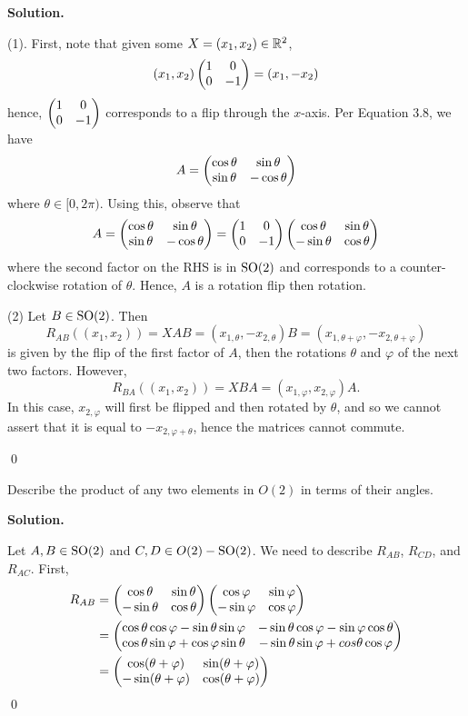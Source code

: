 \documentclass[12pt]{book}
\theoremstyle{definition}
\newenvironment{solution}
{%
  \par\noindent\textbf{Solution.}\quad
}
{%
  \qed\par
}
\begin{document}
\begin{solution}
  (1). First, note that given some $X = (x_1, x_2) \in \mathbb{R}^2$,
  \[
    (x_1, x_2)\begin{pmatrix} 1 & 0 \\ 0 & -1 \end{pmatrix} = (x_1, -x_2)
  \]
  hence, $\begin{pmatrix} 1 & 0 \\ 0 & -1 \end{pmatrix}$ corresponds to a flip through the $x$-axis.
  Per Equation 3.8, we have
  \[
  A = \begin{pmatrix} \cos\theta & \sin\theta \\ \sin\theta & -\cos\theta \end{pmatrix}
  \]
  where $\theta \in [0, 2\pi)$.
  Using this, observe that
  \[
    A = \begin{pmatrix} \cos\theta & \sin\theta \\ \sin\theta & -\cos\theta \end{pmatrix} = \begin{pmatrix} 1 & 0 \\ 0 & -1 \end{pmatrix} \begin{pmatrix} \cos \theta & \sin \theta \\ -\sin\theta & \cos\theta \end{pmatrix}
  \]
  where the second factor on the RHS is in $\mathrm{SO}(2)$ and corresponds to a counter-clockwise rotation of $\theta$.
  Hence, $A$ is a rotation flip then rotation.

  (2) Let $B \in \mathrm{SO}(2)$. Then 
  \[
  R_{AB}((x_1, x_2)) = XAB = (x_{1, \theta}, -x_{2, \theta})B = (x_{1, \theta + \varphi}, -x_{2, \theta + \varphi})
  \]
  is given by the flip of the first factor of $A$, then the rotations $\theta$ and $\varphi$ of the next two factors.
  However,
  \[
  R_{BA}((x_1, x_2)) = XBA = (x_{1, \varphi}, x_{2, \varphi})A.
  \]
  In this case, $x_{2, \varphi}$ will first be flipped and then rotated by $\theta$, and so we cannot assert that it is equal to $-x_{2, \varphi + \theta}$, hence the matrices cannot commute.

\end{solution}

\begin{taggedexercise}[\textcolor{yellow}{WIP}]
  Describe the product of any two elements in $O(2)$ in terms of their angles.
\end{taggedexercise}

\begin{solution}
  Let $A, B \in \mathrm{SO}(2)$ and $C, D \in O(2) - \mathrm{SO}(2)$.
  We need to describe $R_{AB}$, $R_{CD}$, and $R_{AC}$.
  First, 
  \[
  \begin{aligned}
    R_{AB} &= \begin{pmatrix} \cos \theta & \sin \theta \\ -\sin\theta & \cos\theta \end{pmatrix} \begin{pmatrix} \cos \varphi & \sin \varphi \\ -\sin\varphi & \cos\varphi \end{pmatrix} \\
           &= \begin{pmatrix} \cos\theta\cos\varphi - \sin\theta\sin\varphi & -\sin\theta\cos\varphi - \sin\varphi\cos\theta \\ \cos\theta\sin\varphi + \cos\varphi\sin\theta & -\sin\theta\sin\varphi + cos\theta\cos\varphi \end{pmatrix} \\
           &= \begin{pmatrix} \cos(\theta + \varphi) & \sin(\theta + \varphi) \\ -\sin(\theta + \varphi) & \cos(\theta + \varphi) \end{pmatrix}
  \end{aligned}
  \]
\end{solution}
\end{document}
